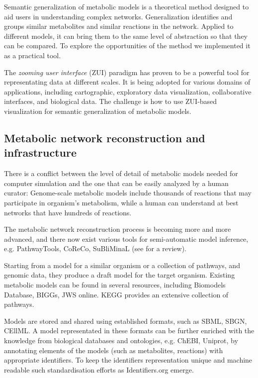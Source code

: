 \documentclass{bmcart}
\begin{document}
Semantic generalization of metabolic models\cite{Zhukova2014} is a theoretical method designed to aid users in understanding complex networks. Generalization identifies and groups similar metabolites and similar reactions in the network.
Applied to different models, it can bring them to the same level of abstraction so that they can be compared.
To explore the opportunities of the method we implemented it as a practical tool.

The \emph{zooming user interface} (ZUI)\cite{Bederson1998} paradigm has proven to be a powerful tool for representating data at different scales. It is being adopted for various domains of applications, including cartographic\cite{Nivala2008}, exploratory data visualization\cite{Roberts2005}, collaborative interfaces\cite{Laufer2011}, and biological data\cite{Hu2007}. The challenge is how to use ZUI-based visualization for semantic generalization of metabolic models.

\subsection*{Metabolic network reconstruction and infrastructure}
There is a conflict between the level of detail of metabolic models needed for computer simulation and the one that can be easily analyzed by a human curator: Genome-scale metabolic models include thousands of reactions that may participate in organism's metabolism, while a human can understand at best networks that have hundreds of reactions.

The metabolic network reconstruction process is becoming more and more advanced, and there now exist various tools for semi-automatic model inference, e.g. PathwayTools\cite{Karp2002}, CoReCo\cite{Pitkanen2014}, SuBliMinaL\cite{Swainston2011} (see \cite{Hamilton2014} for a review).

Starting from a model for a similar organism or a collection of pathways, and genomic data, they produce a draft model for the target organism. Existing metabolic models can be found in several resources, including Biomodels Database\cite{Li10}, BIGGs\cite{Schellenberger2010}, JWS online\cite{Snoep2003}. KEGG\cite{Kanehisa12} provides an extensive collection of pathways. 

Models are stored and shared using established formats, such as SBML\cite{Hucka2003}, SBGN\cite{Moodie2011}, CEllML\cite{Lloyd2004}. A model representated in these formats can be further enriched with the knowledge from biological databases and ontologies, e.g. ChEBI\cite{deMatos10}, Uniprot\cite{TheUniProtConsortium2013}, by annotating elements of the models (such as metabolites, reactions) with appropriate identifiers. To keep the identifiers representation unique and machine readable such standardisation efforts as Identifiers.org\cite{Juty2012} emerge.
\end{document}
